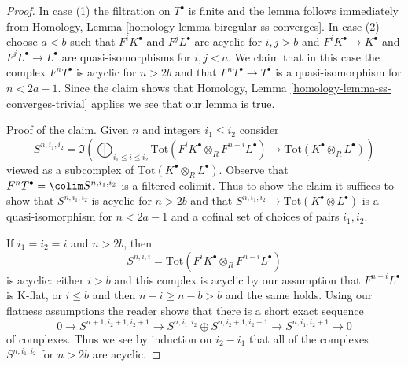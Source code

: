 \begin{proof}
In case (1) the filtration on $T^\bullet$ is finite and the lemma follows
immediately from
Homology, Lemma \ref{homology-lemma-biregular-ss-converges}.
In case (2) choose $a < b$ such that $F^iK^\bullet$ and $F^jL^\bullet$ are
acyclic for $i, j > b$ and $F^iK^\bullet \to K^\bullet$ and
$F^jL^\bullet \to L^\bullet$ are quasi-isomorphisms for $i, j < a$.
We claim that in this case the complex $F^nT^\bullet$ is acyclic for
$n > 2b$ and that $F^nT^\bullet \to T^\bullet$ is a quasi-isomorphism
for $n < 2a - 1$. Since the claim shows that
Homology, Lemma \ref{homology-lemma-ss-converges-trivial}
applies we see that our lemma is true.

\medskip\noindent
Proof of the claim. Given $n$ and integers $i_1 \leq i_2$ consider
$$
S^{n, i_1, i_2} =
\Im\left(
\bigoplus\nolimits_{i_1 \leq i \leq i_2}
\text{Tot}(F^iK^\bullet \otimes_R F^{n - i}L^\bullet)
\to
\text{Tot}(K^\bullet \otimes_R L^\bullet)
\right)
$$
viewed as a subcomplex of $\text{Tot}(K^\bullet \otimes_R L^\bullet)$.
Observe that $F^nT^\bullet = \colim S^{n, i_1, i_2}$ is a filtered colimit.
Thus to show the claim it suffices to show that $S^{n, i_1, i_2}$ is acyclic
for $n > 2b$ and that
$S^{n, i_1, i_2} \to \text{Tot}(K^\bullet \otimes L^\bullet)$
is a quasi-isomorphism for $n < 2a - 1$ and a cofinal set of choices of
pairs $i_1, i_2$.

\medskip\noindent
If $i_1 = i_2 = i$ and $n > 2b$, then
$$
S^{n, i, i} =
\text{Tot}(F^iK^\bullet \otimes_R F^{n - i}L^\bullet)
$$
is acyclic: either $i > b$ and this complex is acyclic by 
our assumption that $F^{n - i}L^\bullet$ is K-flat, or
$i \leq b$ and then $n - i \geq n - b > b$ and the same holds.
Using our flatness assumptions the reader shows that there is a short
exact sequence
$$
0 \to
S^{n + 1, i_2 + 1, i_2 + 1}
\to
S^{n, i_1, i_2} \oplus S^{n, i_2 + 1, i_2 + 1}
\to
S^{n, i_1, i_2 + 1}
\to
0
$$
of complexes. Thus we see by induction on $i_2 - i_1$ that all of the complexes
$S^{n, i_1, i_2}$ for $n > 2b$ are acyclic.


\end{proof}
